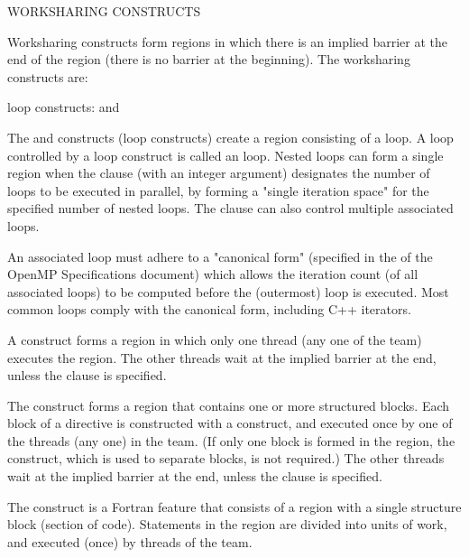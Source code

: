 WORKSHARING CONSTRUCTS

Worksharing constructs form regions in which there is an implied barrier at
the end of the region (there is no barrier at the beginning). The worksharing
constructs are:

\begin{compactitem}

\item loop constructs: { and  }
\item {}
\item {}
\item {}

\end{compactitem}

The  and  constructs (loop constructs) create a region 
consisting of a loop.  A loop controlled by a loop construct is called 
an  loop.  Nested loops can form a single region when the 
 clause (with an integer argument) designates the number of 
 loops to be executed in parallel, by forming a 
"single iteration space" for the specified number of nested loops.  
The  clause can also control multiple associated loops.

An associated loop must adhere to a "canonical form" (specified in the 
 of the OpenMP Specifications document) which allows the 
iteration count (of all associated loops) to be computed before the 
(outermost) loop is executed. %
Most common loops comply with the canonical form, including C++ iterators.

A  construct forms a region in which only one thread (any one 
of the team) executes the region. 
The other threads wait at the implied 
barrier at the end, unless the  clause is specified.

The  construct forms a region that contains one or more 
structured blocks.  Each block of a  directive is 
constructed with a  construct, and executed once by 
one of the threads (any one) in the team.  (If only one block is 
formed in the region, the  construct, which is used to
separate blocks, is not required.)
The other threads wait at the implied 
barrier at the end, unless the  clause is specified.


The  construct is a Fortran feature that consists of a
region with a single structure block (section of code). Statements in the
 region are divided into units of work, and executed (once)
by threads of the team.  

